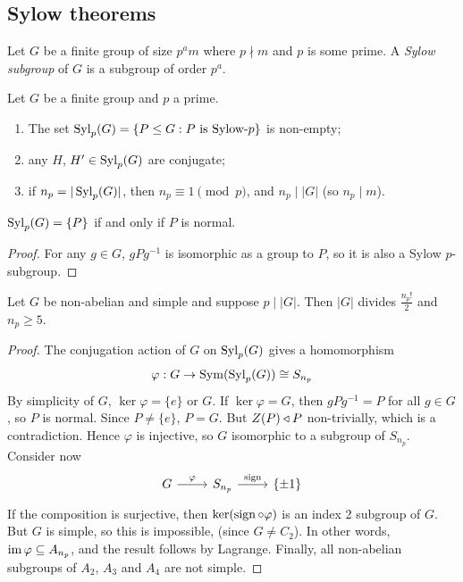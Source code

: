 \documentclass{../template/note}
\begin{document}
    \subsection{Sylow theorems}

    Let $G$ be a finite group of size $p^am$ where $p \nmid m$ and $p$ is some prime. A \emph{Sylow subgroup} of $G$ is a subgroup of order $p^a$.

    \begin{theorem}
        Let $G$ be a finite group and $p$ a prime.
        \begin{enumerate}
            \item The set $\operatorname{Syl}_p(G) = \{P \leq G: P \text{ is Sylow-}p\}$ is non-empty;
            \item any $H$, $H' \in \operatorname{Syl}_p(G)$ are conjugate;
            \item if $n_p = |\operatorname{Syl}_p(G)|$, then $n_p \equiv 1 \pmod p$, and $n_p \mid |G|$ (so $n_p \mid m$).
        \end{enumerate}
    \end{theorem}
    
    \begin{corollary}
        $\operatorname{Syl}_p(G) = \{P\}$ if and only if $P$ is normal.
    \end{corollary}
    
    \begin{proof}
        For any $g \in G$, $gPg^{-1}$ is isomorphic as a group to $P$, so it is also a Sylow $p$-subgroup.
    \end{proof}
    
    \begin{corollary}
        \label{non-abelian-simple}
        Let $G$ be non-abelian and simple and suppose $p \mid |G|$. Then $|G|$ divides $\frac{n_p!}{2}$ and $n_p \geq 5$.
    \end{corollary}
    
    \begin{proof}
        The conjugation action of $G$ on $\operatorname{Syl}_p(G)$ gives a homomorphism
        \begin{align*}
            \varphi: G \to \operatorname{Sym}(\operatorname{Syl}_p(G)) \cong S_{n_p}
        \end{align*}
        By simplicity of $G$, $\ker \varphi = \{e\}$ or $G$. If $\ker \varphi = G$, then $gPg^{-1} = P$ for all $g \in G$, so $P$ is normal. Since $P \neq \{e\}$, $P = G$. But $Z(P) \triangleleft P$ non-trivially, which is a contradiction. Hence $\varphi$ is injective, so $G$ isomorphic to a subgroup of $S_{n_p}$. Consider now
        \[\begin{tikzcd}
            G & {S_{n_p}} & {\{\pm1\}}
            \arrow["\varphi", from=1-1, to=1-2]
            \arrow["\sign", from=1-2, to=1-3]
        \end{tikzcd}\]
        If the composition is surjective, then $\ker(\operatorname{sign} \circ \varphi)$ is an index 2 subgroup of $G$. But $G$ is simple, so this is impossible, (since $G \neq C_2$). In other words, $\operatorname{im} \varphi \subseteq A_{n_p}$, and the result follows by Lagrange. Finally, all non-abelian subgroups of $A_2$, $A_3$ and $A_4$ are not simple.
    \end{proof}
    
\end{document}
